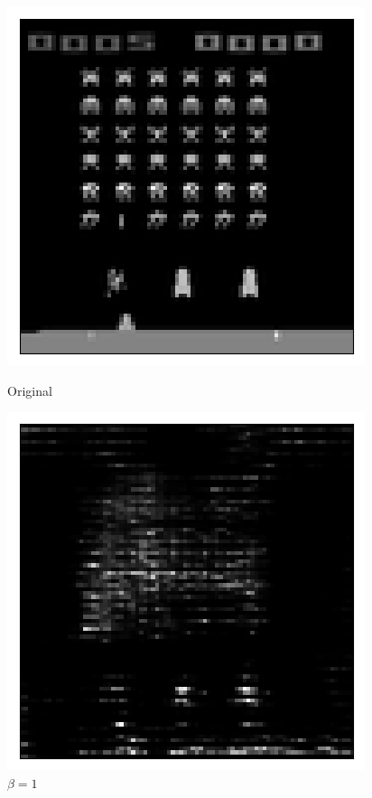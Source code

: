 \begin{figure}[h!]
\centering
\captionsetup{justification=centering}
\begin{multicols}{4}
    \includegraphics[scale=0.4]{figures/results/naive_average/beta_1_posterior_sample_original.png}
    \caption{Original}
    \includegraphics[scale=0.4]{figures/results/naive_average/beta_1_posterior_sample_0.png}
    \caption{$\beta=1$}

\end{multicols}
\end{figure}
